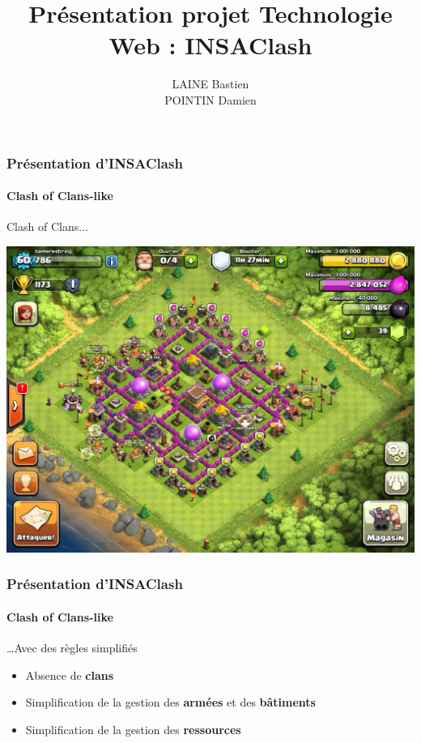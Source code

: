 \documentclass{beamer}
\title{Pr\'esentation projet Technologie Web : INSAClash}
\author{LAINE Bastien \\POINTIN Damien}
\institute{G\'enie Math\'ematique - INSA Rouen}
\begin{document}
    \begin{frame}
    \titlepage
    \end{frame}

    \begin{frame}
        \frametitle{Pr\'esentation d'INSAClash}
        \framesubtitle{Clash of Clans-like}
        Clash of Clans...
        \begin{center}
            \includegraphics[scale=0.2]{images/clashOfClan.jpg}
        \end{center}
    \end{frame}

    \begin{frame}
        \frametitle{Pr\'esentation d'INSAClash}
        \framesubtitle{Clash of Clans-like}
        \ldots Avec des règles simplifi\'es
        \begin{itemize}
            \item Absence de \textbf{clans}
            \item Simplification de la gestion des \textbf{arm\'ees} et des \textbf{bâtiments}
            \item Simplification de la gestion des \textbf{ressources}
        \end{itemize}
    \end{frame}
\end{document}
